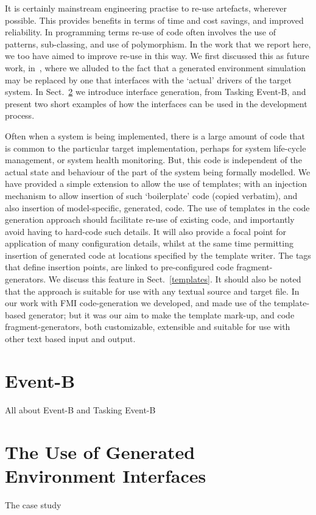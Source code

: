 \documentclass{llncs}%
\begin{document}
It is certainly mainstream engineering practise to re-use artefacts, wherever possible. This provides benefits in terms of time and cost savings, and improved reliability. In programming terms re-use of code often involves the use of patterns, sub-classing, and use of polymorphism. In the work that we report here, we too have aimed to improve re-use in this way. We first discussed this as future work, in~\cite{ae2011a}, where we alluded to the fact that a generated environment simulation may be replaced by one that interfaces with the `actual' drivers of the target system. In Sect.~\ref{interfaces} we introduce interface generation, from Tasking Event-B, and present two short examples of how the interfaces can be used in the development process.

Often when a system is being implemented, there is a large amount of code that is common to the particular target implementation, perhaps for system life-cycle management, or system health monitoring. But, this code is independent of the actual state and behaviour of the part of the system being formally modelled. We have provided a simple extension to allow the use of templates; with an injection mechanism to allow insertion of  such `boilerplate' code (copied verbatim), and also insertion of model-specific, generated, code.  The use of templates in the code generation approach should facilitate re-use of existing code, and importantly avoid having to hard-code such details. It will also provide a focal point for application of many configuration details, whilst at the same time permitting insertion of generated code at locations specified by the template writer. The tags that define insertion points, are linked to pre-configured code fragment-generators. We discuss this feature in Sect.~\ref{templates}. It should also be noted that the approach is suitable for use with any textual source and target file. In our work with FMI code-generation we developed, and made use of the template-based generator; but it was our aim to make the template mark-up, and code fragment-generators, both customizable, extensible and suitable for use with other text based input and output.  
%
\section{Event-B }
%
All about Event-B and Tasking Event-B
%
%
\section{The Use of Generated Environment Interfaces}\label{interfaces}
%
%
The case study
%
%
%
\end{document}

